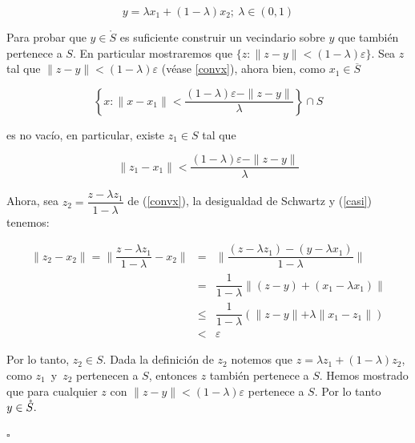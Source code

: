 \begin{equation}
   y = \lambda x_1 + (1 - \lambda)x_2;~ \lambda \in (0, 1)
   \label{convx}
\end{equation}


Para probar que $y \in \mathring{S}$ es suficiente construir un vecindario sobre $y$ que tambi\'en pertenece a $S$. En particular 
mostraremos que $\{z: \parallel z - y \parallel < (1 - \lambda)\varepsilon\}.$ Sea $z$ tal que 
$\parallel z - y \parallel < (1 - \lambda)\varepsilon$ (v\'ease \ref{convx}), ahora bien, como $x_1 \in \overline{S}$

\[\left \{x: \parallel x - x_1 \parallel < \dfrac{(1 - \lambda)\varepsilon - \parallel z - y \parallel}{\lambda} \right \} \cap S\]

es no vac\'io, en particular, existe $z_1 \in S$ tal que 

\begin{equation}
   \parallel z_1 - x_1 \parallel < \displaystyle{\dfrac{(1 - \lambda)\varepsilon - \parallel z - y \parallel}{\lambda}} 
   \label{casi}
\end{equation}


Ahora, sea $z_2 = \dfrac{z - \lambda z_1}{1 - \lambda}$ de (\ref{convx}), la desigualdad de Schwartz y (\ref{casi}) tenemos: 

\begin{eqnarray*}
   \parallel z_2 - x_2 \parallel = \parallel \dfrac{z - \lambda z_1}{1 - \lambda} - x_2 \parallel &=& \displaystyle{\parallel \dfrac{(z - \lambda z_1) - (y - \lambda x_1)}{1 - \lambda} \parallel} \\  
   &=& \dfrac{1}{1 - \lambda} \displaystyle{ \left\| (z - y) + (x_1 - \lambda x_1) \right\|} \\
  & \leqslant & \dfrac{1}{1 - \lambda} (\parallel z - y \parallel + \lambda \parallel x_1 - z_1 \parallel)\\
  &<& \varepsilon
\end{eqnarray*}

Por lo tanto, $z_2 \in S.$ Dada la definici\'on de $z_2$ notemos que  $z = \lambda z_1 + (1 - \lambda)z_2$, como $z_1\,$ y $\, z_2$
pertenecen a $S$, entonces $z$ tambi\'en pertenece a $S$. Hemos mostrado que para cualquier $z$ con $\parallel z - y \parallel < 
(1 - \lambda)\varepsilon$ pertenece a $S$. Por lo tanto $y \in \mathring{S}. \\$ 
\begin{flushright}
  $\square$ 
\end{flushright}


